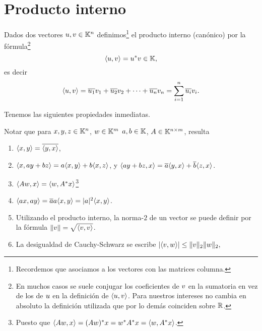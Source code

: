 \section{Producto interno}
\tccdefi
\begin{definicion}
Dados dos vectores $\ub, \vb \in \K^n$ definimos\footnote{Recordemos que asociamos a los vectores con las matrices columna.} el producto interno (canónico) por la fórmula\footnote{En muchos casos se suele conjugar los coeficientes de $\vb$ en la sumatoria en vez de los de $\ub$  en la definición de $\langle \ub,\vb\rangle$. Para nuestros intereses no cambia en absoluto la definición utilizada que por lo demás coinciden sobre $\mathbb R$.} $$
\langle \ub, \vb \rangle = \ub^*\vb\in \K,
$$
es decir
$$
\langle \ub, \vb \rangle=\overline{u_1} v_1 + \overline{u_2} v_2 + \dots + \overline{u_n} v_n = \sum_{i=1}^{n} \overline{u_i}v_i.
$$
\end{definicion}
\etcc
Tenemos las siguientes propiedades inmediatas.

\tcc
\begin{observacion}
\label{obs:interno}
Notar que para $\xb,\yb,\zb \in \K^n$, $\wb\in \K^m$ $a,b \in \mathbb K$,  $\Ab\in \K^{n \times m}$, resulta

\begin{enumerate}
\item   $\langle \xb, \yb \rangle= \overline{\langle \yb, \xb \rangle}$,
\item   $\langle \xb, a\yb + b\zb \rangle = a \langle \xb, \yb \rangle + b \langle \xb, \zb \rangle$,  y $\langle a\yb + b\zb,\xb \rangle = \overline{a} \langle \yb, \xb \rangle + \overline{b} \langle \zb, \xb \rangle$.
\item  $\langle \Ab\wb, \xb \rangle = \langle  \wb,\Ab^* \xb \rangle$\footnote{Puesto que $\langle \Ab\wb, \xb \rangle = (\Ab\wb)^*\xb=\wb^*\Ab^*\xb= \langle  \wb,\Ab^* \xb \rangle$.}
  \item $\langle a\xb, a\yb \rangle = \overline{a}a \langle \xb, \yb \rangle=|a|^2 \langle \xb, \yb \rangle$.
\item  Utilizando el producto interno, la norma-$2$ de un vector se puede definir por la fórmula $\|\vb\| = \sqrt{\langle \vb, \vb\rangle}$.
\item La desigualdad de Cauchy-Schwarz se escribe
$|\langle \vb,\wb\rangle|\le \|\vb\|_2\|\wb\|_2,$
 \end{enumerate}
\end{observacion}
\etcc

